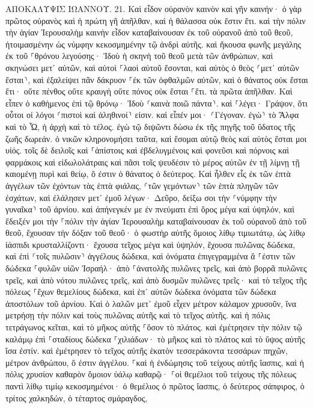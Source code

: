 \documentclass[twoside, 9pt]{extreport}
\begin{document}
ΑΠΟΚΑΛΥΨΙΣ ΙΩΑΝΝΟΥ.
21.
Καὶ εἶδον οὐρανὸν καινὸν καὶ γῆν καινήν· ὁ γὰρ πρῶτος οὐρανὸς καὶ ἡ πρώτη γῆ ἀπῆλθαν, καὶ ἡ θάλασσα οὐκ ἔστιν ἔτι. 
καὶ τὴν πόλιν τὴν ἁγίαν Ἰερουσαλὴμ καινὴν εἶδον καταβαίνουσαν ἐκ τοῦ οὐρανοῦ ἀπὸ τοῦ θεοῦ, ἡτοιμασμένην ὡς νύμφην κεκοσμημένην τῷ ἀνδρὶ αὐτῆς. 
καὶ ἤκουσα φωνῆς μεγάλης ἐκ τοῦ ⸀θρόνου λεγούσης· Ἰδοὺ ἡ σκηνὴ τοῦ θεοῦ μετὰ τῶν ἀνθρώπων, καὶ σκηνώσει μετ᾽ αὐτῶν, καὶ αὐτοὶ ⸀λαοὶ αὐτοῦ ἔσονται, καὶ αὐτὸς ὁ θεὸς ⸂μετ᾽ αὐτῶν ἔσται⸃, 
καὶ ἐξαλείψει πᾶν δάκρυον ⸀ἐκ τῶν ὀφθαλμῶν αὐτῶν, καὶ ὁ θάνατος οὐκ ἔσται ἔτι· οὔτε πένθος οὔτε κραυγὴ οὔτε πόνος οὐκ ἔσται ⸀ἔτι. τὰ πρῶτα ἀπῆλθαν. 
Καὶ εἶπεν ὁ καθήμενος ἐπὶ τῷ θρόνῳ· Ἰδοὺ ⸂καινὰ ποιῶ πάντα⸃. καὶ ⸀λέγει· Γράψον, ὅτι οὗτοι οἱ λόγοι ⸂πιστοὶ καὶ ἀληθινοί⸃ εἰσιν. 
καὶ εἶπέν μοι· ⸂Γέγοναν. ἐγὼ⸃ τὸ Ἄλφα καὶ τὸ Ὦ, ἡ ἀρχὴ καὶ τὸ τέλος. ἐγὼ τῷ διψῶντι δώσω ἐκ τῆς πηγῆς τοῦ ὕδατος τῆς ζωῆς δωρεάν. 
ὁ νικῶν κληρονομήσει ταῦτα, καὶ ἔσομαι αὐτῷ θεὸς καὶ αὐτὸς ἔσται μοι υἱός. 
τοῖς δὲ δειλοῖς καὶ ⸀ἀπίστοις καὶ ἐβδελυγμένοις καὶ φονεῦσι καὶ πόρνοις καὶ φαρμάκοις καὶ εἰδωλολάτραις καὶ πᾶσι τοῖς ψευδέσιν τὸ μέρος αὐτῶν ἐν τῇ λίμνῃ τῇ καιομένῃ πυρὶ καὶ θείῳ, ὅ ἐστιν ὁ θάνατος ὁ δεύτερος. 
Καὶ ἦλθεν εἷς ἐκ τῶν ἑπτὰ ἀγγέλων τῶν ἐχόντων τὰς ἑπτὰ φιάλας, ⸂τῶν γεμόντων⸃ τῶν ἑπτὰ πληγῶν τῶν ἐσχάτων, καὶ ἐλάλησεν μετ᾽ ἐμοῦ λέγων· Δεῦρο, δείξω σοι τὴν ⸂νύμφην τὴν γυναῖκα⸃ τοῦ ἀρνίου. 
καὶ ἀπήνεγκέν με ἐν πνεύματι ἐπὶ ὄρος μέγα καὶ ὑψηλόν, καὶ ἔδειξέν μοι τὴν ⸀πόλιν τὴν ἁγίαν Ἰερουσαλὴμ καταβαίνουσαν ἐκ τοῦ οὐρανοῦ ἀπὸ τοῦ θεοῦ, 
ἔχουσαν τὴν δόξαν τοῦ θεοῦ· ὁ φωστὴρ αὐτῆς ὅμοιος λίθῳ τιμιωτάτῳ, ὡς λίθῳ ἰάσπιδι κρυσταλλίζοντι· 
ἔχουσα τεῖχος μέγα καὶ ὑψηλόν, ἔχουσα πυλῶνας δώδεκα, καὶ ἐπὶ ⸂τοῖς πυλῶσιν⸃ ἀγγέλους δώδεκα, καὶ ὀνόματα ἐπιγεγραμμένα ἅ ⸀ἐστιν τῶν δώδεκα ⸀φυλῶν υἱῶν Ἰσραήλ· 
ἀπὸ ⸀ἀνατολῆς πυλῶνες τρεῖς, καὶ ἀπὸ βορρᾶ πυλῶνες τρεῖς, καὶ ἀπὸ νότου πυλῶνες τρεῖς, καὶ ἀπὸ δυσμῶν πυλῶνες τρεῖς· 
καὶ τὸ τεῖχος τῆς πόλεως ⸀ἔχων θεμελίους δώδεκα, καὶ ἐπ᾽ αὐτῶν δώδεκα ὀνόματα τῶν δώδεκα ἀποστόλων τοῦ ἀρνίου. 
Καὶ ὁ λαλῶν μετ᾽ ἐμοῦ εἶχεν μέτρον κάλαμον χρυσοῦν, ἵνα μετρήσῃ τὴν πόλιν καὶ τοὺς πυλῶνας αὐτῆς καὶ τὸ τεῖχος αὐτῆς. 
καὶ ἡ πόλις τετράγωνος κεῖται, καὶ τὸ μῆκος αὐτῆς ⸀ὅσον τὸ πλάτος. καὶ ἐμέτρησεν τὴν πόλιν τῷ καλάμῳ ἐπὶ ⸀σταδίους δώδεκα ⸀χιλιάδων· τὸ μῆκος καὶ τὸ πλάτος καὶ τὸ ὕψος αὐτῆς ἴσα ἐστίν. 
καὶ ἐμέτρησεν τὸ τεῖχος αὐτῆς ἑκατὸν τεσσεράκοντα τεσσάρων πηχῶν, μέτρον ἀνθρώπου, ὅ ἐστιν ἀγγέλου. 
⸀καὶ ἡ ἐνδώμησις τοῦ τείχους αὐτῆς ἴασπις, καὶ ἡ πόλις χρυσίον καθαρὸν ὅμοιον ὑάλῳ καθαρῷ· 
⸀οἱ θεμέλιοι τοῦ τείχους τῆς πόλεως παντὶ λίθῳ τιμίῳ κεκοσμημένοι· ὁ θεμέλιος ὁ πρῶτος ἴασπις, ὁ δεύτερος σάπφιρος, ὁ τρίτος χαλκηδών, ὁ τέταρτος σμάραγδος, 
\end{document}
